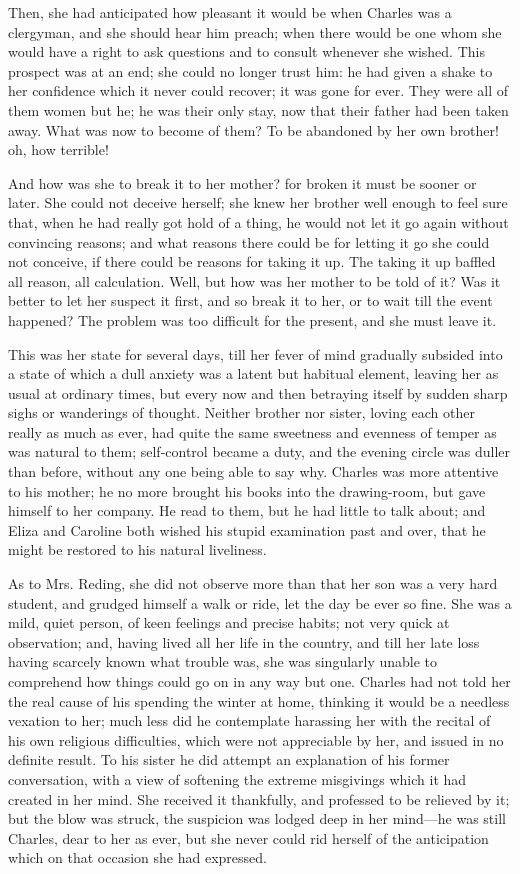Then, she had anticipated how pleasant it would be when Charles was
a clergyman, and she should hear him preach; when there would be one
whom she would have a right to ask questions and to consult whenever
she wished. This prospect was at an end; she could no longer trust
him: he had given a shake to her confidence which it never could
recover; it was gone for ever. They were all of them women but
he; he was their only stay, now that their father had been taken away.
What was now to become of them? To be abandoned by her own brother!
oh, how terrible!

And how was she to break it to her mother? for broken it must be
sooner or later. She could not deceive herself; she knew her brother
well enough to feel sure that, when he had really got hold of a thing,
he would not let it go again without convincing reasons; and what
reasons there could be for letting it go she could not conceive, if
there could be reasons for taking it up. The taking it up baffled all
reason, all calculation. Well, but how was her mother to be told of
it? Was it better to let her suspect it first, and so break it to her,
or to wait till the event happened? The problem was too difficult for
the present, and she must leave it.

This was her state for several days, till her fever of mind
gradually subsided into a state of which a dull anxiety was a latent
but habitual element, leaving her as usual at ordinary times, but
every now and then betraying itself by sudden sharp sighs or
wanderings of thought. Neither brother nor sister, loving each other
really as much as ever, had quite the same sweetness and evenness of
temper as was natural to them; self-control became a duty, and the
evening circle was duller than before, without any one being able to
say why. Charles was more attentive to his mother; he no more brought
his books into the drawing-room, but gave himself to her company. He
read to them, but he had little to talk about; and Eliza and Caroline
both wished his stupid examination past and over, that he might
be restored to his natural liveliness.

As to Mrs. Reding, she did not observe more than that her son was a
very hard student, and grudged himself a walk or ride, let the day be
ever so fine. She was a mild, quiet person, of keen feelings and
precise habits; not very quick at observation; and, having lived all
her life in the country, and till her late loss having scarcely known
what trouble was, she was singularly unable to comprehend how things
could go on in any way but one. Charles had not told her the real
cause of his spending the winter at home, thinking it would be a
needless vexation to her; much less did he contemplate harassing her
with the recital of his own religious difficulties, which were not
appreciable by her, and issued in no definite result. To his sister he
did attempt an explanation of his former conversation, with a view of
softening the extreme misgivings which it had created in her mind. She
received it thankfully, and professed to be relieved by it; but the
blow was struck, the suspicion was lodged deep in her mind—he was
still Charles, dear to her as ever, but she never could rid herself of
the anticipation which on that occasion she had expressed.


